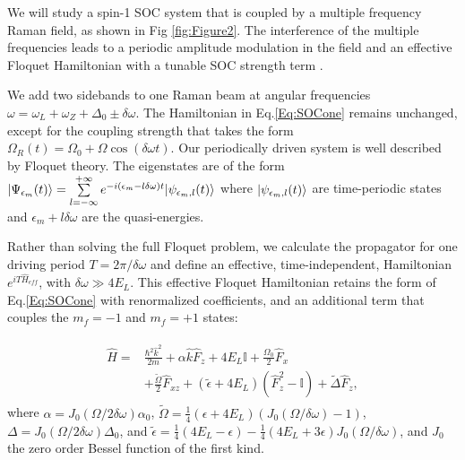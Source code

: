 We will study a spin-1 SOC system that is coupled by a multiple frequency Raman field, as shown in Fig \ref{fig:Figure2}. The interference of the multiple frequencies leads to a periodic amplitude modulation in the field and an effective Floquet Hamiltonian with a tunable SOC strength term \cite{jimenez-garcia_tunable_2015}.

We add two sidebands to one Raman beam at angular frequencies $\omega=\omega_L+\omega_Z+\Delta_0 \pm \delta\omega$.  The Hamiltonian in Eq.\ref{Eq:SOCone} remains unchanged, except for the coupling strength that takes the form $	\Omega_R(t)=\Omega_0 + \Omega\cos(\delta\omega t)$. Our periodically driven system is well described by Floquet theory. The eigenstates are of the form $|\Psi_{\epsilon_m}(t)\rangle=\sum\limits_{l=-\infty}^{+\infty}e^{-i(\epsilon_m-l\delta\omega) t}|\psi_{\epsilon_m,l}(t)\rangle$ where $|\psi_{\epsilon_m,l}(t)\rangle$ are time-periodic states and $\epsilon_m+l\delta\omega$ are the quasi-energies.


Rather than solving the full Floquet problem, we calculate the propagator for one driving period $T=2\pi/\delta\omega$ and define an effective, time-independent, Hamiltonian  $e^{iT\hat{H}_{eff}}$, with $\delta\omega \gg 4E_L$. This effective Floquet Hamiltonian retains the form of Eq.\ref{Eq:SOCone} with renormalized coefficients, and an additional term that couples the $m_f=-1$ and $m_f=+1$ states:

\begin{align}
	\begin{split}
		\hat{H} = &\frac{\hbar^2\hat{k}^2}{2m} + \alpha\hat{k}\hat{F}_z +4E_L\mathbb{I} + \frac{\Omega_0}{2}\hat{F}_x \\
		&+ \frac{\tilde{\Omega}}{2}\hat{F}_{xz} +(\tilde{\epsilon}+4E_L)(\hat{F}_z^2-\mathbb{I}) +\tilde{\Delta}\hat{F}_z, 
		\label{Eq:SOCeff}
	\end{split}
\end{align}	
%
where $\alpha= J_0(\Omega/2\delta\omega)\alpha_0$, $\tilde{\Omega}=\frac{1}{4}(\epsilon+4E_L) (J_0(\Omega/\delta\omega)-1)$, $\Delta=J_0(\Omega/2\delta\omega)\Delta_0$, and $\tilde{\epsilon}= \frac{1}{4}(4E_L-\epsilon) - 
\frac{1}{4}(4E_L + 3 \epsilon) J_0( \Omega/\delta\omega)$, and $J_0$ the zero order Bessel function of the first kind.

